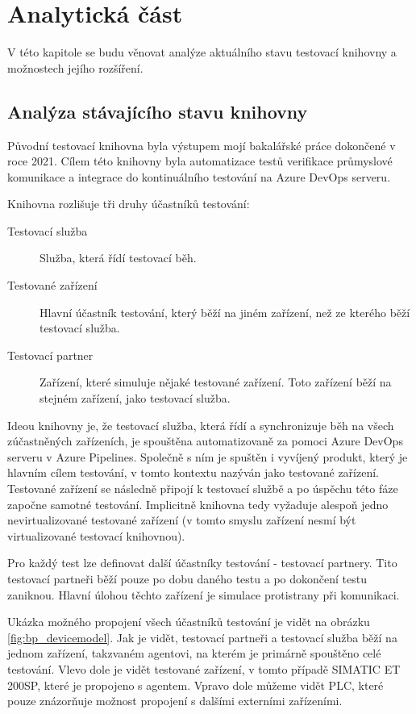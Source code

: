 \chapter{Analytická část}\label{chap:anal}

V této kapitole se budu věnovat analýze aktuálního stavu testovací knihovny a možnostech jejího rozšíření.


\section{Analýza stávajícího stavu knihovny}

Původní testovací knihovna byla výstupem mojí bakalářské práce\cite{bakalarka} dokončené v roce 2021. Cílem této knihovny byla automatizace testů verifikace průmyslové komunikace a integrace do kontinuálního testování na Azure DevOps serveru. 

Knihovna rozlišuje tři druhy účastníků testování:

\begin{description}
    \item[Testovací služba] Služba, která řídí testovací běh.
    \item[Testované zařízení] Hlavní účastník testování, který běží na jiném zařízení, než ze kterého běží testovací služba. 
    \item[Testovací partner] Zařízení, které simuluje nějaké testované zařízení. Toto zařízení běží na stejném zařízení, jako testovací služba. 
\end{description}

Ideou knihovny je, že testovací služba, která řídí a synchronizuje běh na všech zúčastněných zařízeních, je spouštěna automatizovaně za pomoci Azure DevOps serveru v Azure Pipelines. Společně s ním je spuštěn i vyvíjený produkt, který je hlavním cílem testování, v tomto kontextu nazýván jako testované zařízení. Testované zařízení se následně připojí k testovací službě a po úspěchu této fáze započne samotné testování. Implicitně knihovna tedy vyžaduje alespoň jedno nevirtualizované testované zařízení (v tomto smyslu zařízení nesmí být virtualizované testovací knihovnou). 

Pro každý test lze definovat další účastníky testování - testovací partnery. Tito testovací partneři běží pouze po dobu daného testu a po dokončení testu zaniknou. Hlavní úlohou těchto zařízení je simulace protistrany při komunikaci. 

Ukázka možného propojení všech účastníků testování je vidět na obrázku \ref{fig:bp_devicemodel}. Jak je vidět, testovací partneři a testovací služba běží na jednom zařízení, takzvaném agentovi, na kterém je primárně spouštěno celé testování. Vlevo dole je vidět testované zařízení, v tomto případě SIMATIC ET 200SP, které je propojeno s agentem. Vpravo dole můžeme vidět PLC, které pouze znázorňuje možnost propojení s dalšími externími zařízeními.

